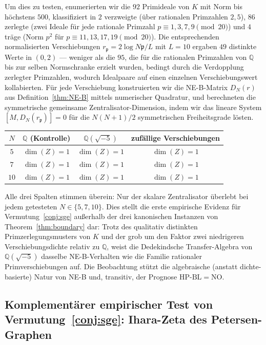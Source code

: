 \documentclass[11pt]{article}
\theoremstyle{definition}
\theoremstyle{remark}
\newcommand{\HBL}{\mathrm{HP\text{-}BL}}
\begin{document}
Um dies zu testen, enumerierten wir die $92$ Primideale von $K$ mit Norm bis
höchstens $500$, klassifiziert in $2$ verzweigte (über rationalen Primzahlen $2, 5$),
$86$ zerlegte (zwei Ideale für jede rationale Primzahl $p \equiv 1, 3, 7,
9 \pmod{20}$) und $4$ träge (Norm $p^2$ für $p \equiv 11, 13, 17,
19 \pmod{20}$). Die entsprechenden normalisierten Verschiebungen $r_\mathfrak{p}
= 2\log N\mathfrak{p}/L$ mit $L = 10$ ergaben $49$ distinkte Werte
in $(0, 2)$ --- weniger als die $95$, die für die rationalen Primzahlen
von $\mathbb{Q}$ bis zur selben Normschranke erzielt wurden, bedingt durch die Verdopplung
zerlegter Primzahlen, wodurch Idealpaare auf einen einzelnen Verschiebungswert kollabierten.
Für jede Verschiebung konstruierten wir die NE-B-Matrix $D_N(r)$ aus Definition~\ref{thm:NE-B}
mittels numerischer Quadratur, und berechneten die symmetrische gemeinsame
Zentralisator-Dimension, indem wir das lineare System
$[M, D_N(r_\mathfrak{p})] = 0$ für die $N(N+1)/2$ symmetrischen
Freiheitsgrade lösten.

\begin{center}
\begin{tabular}{@{}c c c c@{}}
\toprule
$N$ & $\mathbb{Q}$ (Kontrolle) & $\mathbb{Q}(\sqrt{-5})$ & zufällige Verschiebungen \\
\midrule
$5$ & $\dim(Z) = 1$ & $\dim(Z) = 1$ & $\dim(Z) = 1$ \\
$7$ & $\dim(Z) = 1$ & $\dim(Z) = 1$ & $\dim(Z) = 1$ \\
$10$ & $\dim(Z) = 1$ & $\dim(Z) = 1$ & $\dim(Z) = 1$ \\
\bottomrule
\end{tabular}
\end{center}

Alle drei Spalten stimmen überein: Nur der skalare Zentralisator überlebt bei
jedem getesteten $N \in \{5, 7, 10\}$. Dies stellt die erste empirische Evidenz
für Vermutung~\ref{conj:sge} außerhalb der drei kanonischen Instanzen von
Theorem~\ref{thm:boundary} dar: Trotz des qualitativ distinkten
Primzerlegungsmusters von $K$ und der grob um den Faktor zwei niedrigeren Verschiebungsdichte relativ zu $\mathbb{Q}$,
weist die Dedekindsche Transfer-Algebra von $\mathbb{Q}(\sqrt{-5})$
dasselbe NE-B-Verhalten wie die Familie rationaler Primverschiebungen auf.
Die Beobachtung stützt die algebraische (anstatt dichte-basierte) Natur von NE-B
und, transitiv, der Prognose $\HBL = \mathrm{NO}$.

\subsection{Komplementärer empirischer Test von
Vermutung~\ref{conj:sge}: Ihara-Zeta des Petersen-Graphen}
\label{sec:sge-ihara-test}
\end{document}
